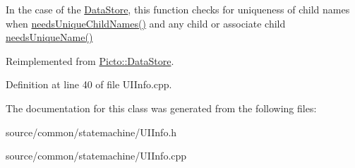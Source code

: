 In the case of the \hyperlink{class_picto_1_1_data_store}{Data\-Store}, this function checks for uniqueness of child names when \hyperlink{class_picto_1_1_data_store_af4853c8c9ec20506d352b1c1bd01360a}{needs\-Unique\-Child\-Names()} and any child or associate child \hyperlink{class_picto_1_1_asset_ad2b39292a4648dcdb9917f4bcf4bd658}{needs\-Unique\-Name()} 

Reimplemented from \hyperlink{class_picto_1_1_data_store_a077c9284e2d18d50b72e0fea1a5eeacb}{Picto\-::\-Data\-Store}.



Definition at line 40 of file U\-I\-Info.\-cpp.



The documentation for this class was generated from the following files\-:\begin{DoxyCompactItemize}
\item 
source/common/statemachine/U\-I\-Info.\-h\item 
source/common/statemachine/U\-I\-Info.\-cpp\end{DoxyCompactItemize}
